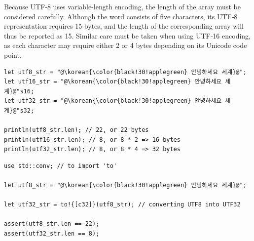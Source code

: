 Because UTF‑8 uses variable-length encoding, the length of the array must be
considered carefully. Although the word \colorbox{background!90!gray!60}{\korean{\color{black!30!applegreen}{"안녕하세요"}}} consists of five
characters, its UTF‑8 representation requires 15 bytes, and the length of the
corresponding \token{\[c8\]} array will thus be reported as 15. Similar care must be
taken when using UTF‑16 encoding, as each character may require either 2 or 4
bytes depending on its Unicode code point.

\begin{lstlisting}[style=coloredverbatim, label=lst:(chap2):encoding_example, caption=Encoding consequence on array length, escapechar=@]
let utf8_str = "@\korean{\color{black!30!applegreen} 안녕하세요 세계}@";
let utf16_str = "@\korean{\color{black!30!applegreen} 안녕하세요 세계}@"s16;
let utf32_str = "@\korean{\color{black!30!applegreen} 안녕하세요 세계}@"s32;

println(utf8_str.len); // 22, or 22 bytes
println(utf16_str.len); // 8, or 8 * 2 => 16 bytes
println(utf32_str.len); // 8, or 8 * 4 => 32 bytes
\end{lstlisting}


\begin{lstlisting}[style=coloredverbatim, label=lst:(chap2):converting_encoding, caption=String encoding conversion, escapechar=@]
use std::conv; // to import 'to'

let utf8_str = "@\korean{\color{black!30!applegreen} 안녕하세요 세계}@";

let utf32_str = to!{[c32]}(utf8_str); // converting UTF8 into UTF32

assert(utf8_str.len == 22);
assert(utf32_str.len == 8);
\end{lstlisting}
